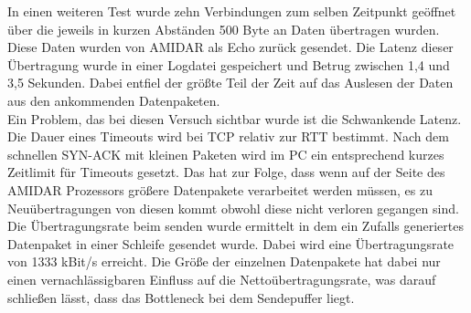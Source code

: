 In einen weiteren Test wurde zehn Verbindungen zum selben Zeitpunkt geöffnet über die jeweils in kurzen Abständen 500 Byte an Daten übertragen wurden. Diese Daten wurden von AMIDAR als Echo zurück gesendet. Die Latenz dieser Übertragung wurde in einer Logdatei gespeichert und Betrug zwischen 1,4 und 3,5 Sekunden. Dabei entfiel der größte Teil der Zeit auf das Auslesen der Daten aus den ankommenden Datenpaketen.\\
Ein Problem, das bei diesen Versuch sichtbar wurde ist die Schwankende Latenz. Die Dauer eines Timeouts wird bei TCP relativ zur RTT bestimmt. Nach dem schnellen SYN-ACK mit kleinen Paketen wird im PC ein entsprechend kurzes Zeitlimit für Timeouts gesetzt. Das hat zur Folge, dass wenn auf der Seite des AMIDAR Prozessors größere Datenpakete verarbeitet werden müssen, es zu Neuübertragungen von diesen kommt obwohl diese nicht verloren gegangen sind.\\

Die Übertragungsrate beim senden wurde ermittelt in dem ein Zufalls generiertes Datenpaket in einer Schleife gesendet wurde. Dabei wird eine Übertragungsrate von 1333 kBit/s erreicht. Die Größe der einzelnen Datenpakete hat dabei nur einen vernachlässigbaren Einfluss auf die Nettoübertragungsrate, was darauf schließen lässt, dass das Bottleneck bei dem Sendepuffer liegt. 




 

 